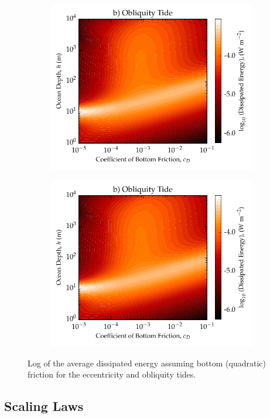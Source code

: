 \begin{figure}[!t]
\centering
\begin{subfigure}{0.48\linewidth}
\centering
\includegraphics[width=\linewidth]{Figures/Obliquity_BottomFric}
\subcaption{\label{fig:bottomFricEcc}}
\end{subfigure}%
\begin{subfigure}{0.48\linewidth}
\centering
\includegraphics[width=\linewidth]{Figures/Obliquity_BottomFric}
\subcaption{\label{fig:bottomFricObliq}}
\end{subfigure}
\vspace*{-0.8cm}
\caption{Log of the average dissipated energy assuming bottom (quadratic) friction for the eccentricity and obliquity tides. \label{fig:bottomFric}}
\end{figure}

\subsection{Scaling Laws \label{subsec:scaling}}